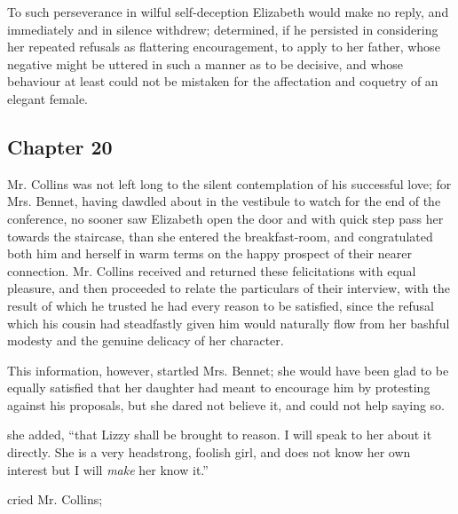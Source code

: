 To such perseverance in wilful self-deception Elizabeth would make no reply, and immediately and in silence withdrew; determined, if he persisted in considering her repeated refusals as flattering encouragement, to apply to her father, whose negative might be uttered in such a manner as to be decisive, and whose behaviour at least could not be mistaken for the affectation and coquetry of an elegant female.

\subsection[chapter-20]{\useURL[url20][][][]\from[url20] Chapter 20}

Mr. Collins was not left long to the silent contemplation of his successful love; for Mrs. Bennet, having dawdled about in the vestibule to watch for the end of the conference, no sooner saw Elizabeth open the door and with quick step pass her towards the staircase, than she entered the breakfast-room, and congratulated both him and herself in warm terms on the happy prospect of their nearer connection. Mr. Collins received and returned these felicitations with equal pleasure, and then proceeded to relate the particulars of their interview, with the result of which he trusted he had every reason to be satisfied, since the refusal which his cousin had steadfastly given him would naturally flow from her bashful modesty and the genuine delicacy of her character.

This information, however, startled Mrs. Bennet; she would have been glad to be equally satisfied that her daughter had meant to encourage him by protesting against his proposals, but she dared not believe it, and could not help saying so.

 she added, “that Lizzy shall be brought to reason. I will speak to her about it directly. She is a very headstrong, foolish girl, and does not know her own interest but I will {\em make} her know it.”

 cried Mr. Collins; 

